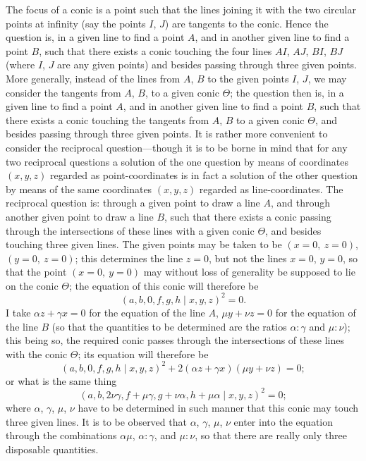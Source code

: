 \documentclass[11pt,a4paper]{article}
\renewcommand{\mid}{\mathbin{|}}
\begin{document}
The focus of a conic is a point such that the lines joining it with the two
circular points at infinity (say the points $I$, $J$) are tangents to the conic. Hence the
question is, in a given line to find a point $A$, and in another given line to find a
point $B$, such that there exists a conic touching the four lines $AI$, $AJ$, $BI$, $BJ$
(where $I$, $J$ are any given points) and besides passing through three given points.
More generally, instead of the lines from $A$, $B$ to the given points $I$, $J$, we may
consider the tangents from $A$, $B$, to a given conic $\Theta$; the question then is, in a
given line to find a point $A$, and in another given line to find a point $B$, such that
there exists a conic touching the tangents from $A$, $B$ to a given conic $\Theta$, and besides
passing through three given points. It is rather more convenient to consider the
reciprocal question---though it is to be borne in mind that for any two reciprocal
questions a solution of the one question by means of coordinates $(x, y, z)$ regarded as
point-coordinates is in fact a solution of the other question by means of the same
coordinates $(x, y, z)$ regarded as line-coordinates. The reciprocal question is: through
a given point to draw a line $A$, and through another given point to draw a line $B$,
such that there exists a conic passing through the intersections of these lines with a
given conic $\Theta$, and besides touching three given lines. The given points may be taken
to be $(x=0,\ z=0)$, $(y=0,\ z=0)$; this determines the line $z=0$, but not the lines
$x=0$, $y=0$, so that the point $(x=0,\ y=0)$ may without loss of generality be supposed
to lie on the conic $\Theta$; the equation of this conic will therefore be
\[
(a, b, 0, f, g, h\!\!\mid\! x, y, z)^2 = 0.
\]
I take $\alpha z + \gamma x = 0$ for the equation of the line $A$, $\mu y + \nu z = 0$ for the equation of the
line $B$ (so that the quantities to be determined are the ratios $\alpha:\gamma$ and $\mu:\nu$); this
being so, the required conic passes through the intersections of these lines with the
conic $\Theta$; its equation will therefore be
\[
(a, b, 0, f, g, h\!\!\mid\! x, y, z)^2 + 2(\alpha z + \gamma x)(\mu y + \nu z) = 0;
\]
or what is the same thing
\[
(a, b, 2\nu\gamma, f+\mu\gamma, g+\nu\alpha, h+\mu\alpha\!\!\mid\! x, y, z)^2 = 0;
\]
where $\alpha$, $\gamma$, $\mu$, $\nu$ have to be determined in such manner that this conic may touch
three given lines. It is to be observed that $\alpha$, $\gamma$, $\mu$, $\nu$ enter into the equation
through the combinations $\alpha\mu$, $\alpha:\gamma$, and $\mu:\nu$, so that there are really only three
disposable quantities.
\end{document}
